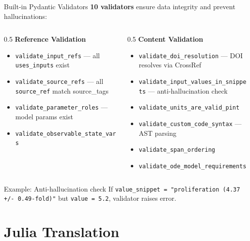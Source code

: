 \documentclass[aspectratio=169,10pt]{beamer}
\begin{document}
\begin{frame}{Built-in Pydantic Validators}
\textbf{10 validators} ensure data integrity and prevent hallucinations:

\begin{columns}
\begin{column}{0.5\textwidth}
\textbf{Reference Validation}
\begin{itemize}
    \item \texttt{validate\_input\_refs} --- all \texttt{uses\_inputs} exist
    \item \texttt{validate\_source\_refs} --- all \texttt{source\_ref} match source\_tags
    \item \texttt{validate\_parameter\_roles} --- model params exist
    \item \texttt{validate\_observable\_state\_vars}
\end{itemize}
\end{column}
\begin{column}{0.5\textwidth}
\textbf{Content Validation}
\begin{itemize}
    \item \texttt{validate\_doi\_resolution} --- DOI resolves via CrossRef
    \item \texttt{validate\_input\_values\_in\_snippets} --- anti-hallucination check
    \item \texttt{validate\_units\_are\_valid\_pint}
    \item \texttt{validate\_custom\_code\_syntax} --- AST parsing
    \item \texttt{validate\_span\_ordering}
    \item \texttt{validate\_ode\_model\_requirements}
\end{itemize}
\end{column}
\end{columns}

\vspace{1em}
\begin{block}{Example: Anti-hallucination check}
If \texttt{value\_snippet = "proliferation (4.37 +/- 0.49-fold)"} but \texttt{value = 5.2}, validator raises error.
\end{block}
\end{frame}

\section{Julia Translation}
\end{document}
